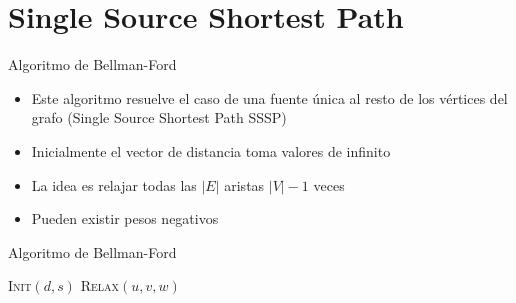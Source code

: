 \documentclass[]{beamer}
\begin{document}
%
%
%
%
%

\section{Single Source Shortest Path}
\begin{frame}{Algoritmo de Bellman-Ford}
  \begin{itemize}
    \item Este algoritmo resuelve el caso de una fuente \'unica al resto de los v\'ertices del grafo (Single Source Shortest Path SSSP)
      \pause
    \item Inicialmente el vector de distancia toma valores de infinito
      \pause
    \item La idea es relajar todas las $|E|$ aristas $|V|-1$ veces
      \pause
    \item Pueden existir pesos negativos
  \end{itemize}
\end{frame}

\begin{frame}{Algoritmo de Bellman-Ford}
  \begin{algorithm}[H]
    \textsc{Init}$(d,s)$
    {
      {
        \textsc{Relax}$(u,v,w)$
      }
    }
    {
      {
      }
    }
  \end{algorithm}
\end{frame}
\end{document}
